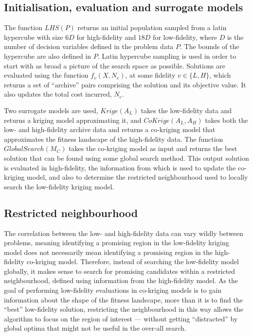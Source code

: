 \subsection{Initialisation, evaluation and surrogate models}
The function $LHS(P)$ returns an initial population sampled from a latin hypercube with size $6D$ for high-fidelity and $18D$ for low-fidelity, where $D$ is the number of decision variables defined in the problem data $P$. The bounds of the hypercube are also defined in $P$. Latin hypercube sampling is used in order to start with as broad a picture of the search space as possible. Solutions are evaluated using the function $f_v(X,N_e)$, at some fidelity $v\in \{L,H\}$, which returns a set of ``archive'' pairs comprising the solution and its objective value. It also updates the total cost incurred, $N_e$. 

Two surrogate models are used, $Krige(A_L)$ takes the low-fidelity data and returns a kriging model approximating it, and $CoKrige(A_L,A_H)$ takes both the low- and high-fidelity archive data and returns a co-kriging model that approximates the fitness landscape of the high-fidelity data. The function $GlobalSearch(M_C)$ takes the co-kriging model as input and returns the best solution that can be found using some global search method. This output solution is evaluated in high-fidelity, the information from which is used to update the co-kriging model, and also to determine the restricted neighbourhood used to locally search the low-fidelity kriging model.

\subsection{Restricted neighbourhood}\label{subsec:restrict}
The correlation between the low- and high-fidelity data can vary wildly between problems, meaning identifying a promising region in the low-fidelity kriging model does not necessarily mean identifying a promising region in the high-fidelity co-kriging model. Therefore, instead of searching the low-fidelity model globally, it makes sense to search for promising candidates within a restricted neighbourhood, defined using information from the high-fidelity model. As the goal of performing low-fidelity evaluations in co-kriging models is to gain information about the shape of the fitness landscape, more than it is to find the ``best'' low-fidelity solution, restricting the neighbourhood in this way allows the algorithm to focus on the region of interest --- without getting ``distracted'' by global optima that might not be useful in the over-all search.


